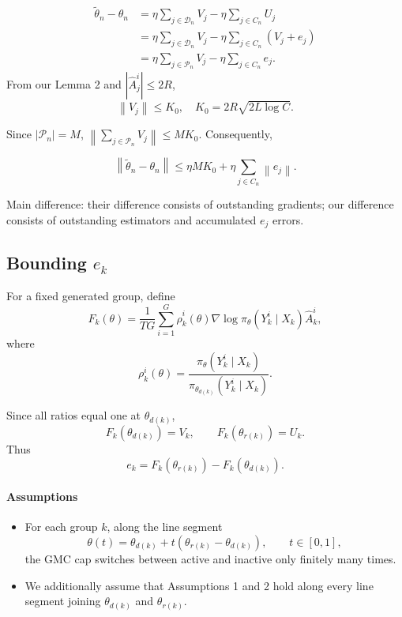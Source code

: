 \begin{lemma}
    \begin{align*}
    \tilde{\theta}_n-\theta_n & =\eta \sum_{j \in \mathcal{D}_n} V_j-\eta \sum_{j \in C_n} U_j \\
    & =\eta \sum_{j \in \mathcal{D}_n} V_j-\eta \sum_{j \in C_n}\left(V_j+e_j\right) \\
    & =\eta \sum_{j \in \mathcal{P}_n} V_j-\eta \sum_{j \in C_n} e_j .
    \end{align*}
    From our Lemma 2 and $\left|\widehat{A}_j^i\right| \leq 2 R$,
    \begin{equation} \label{eq:gentimeestbound}
            \left\|V_j\right\| \leq K_0, \quad K_0=2 R \sqrt{2 L \log C} .
    \end{equation}


    Since $\left|\mathcal{P}_n\right|=M$,
    $
    \left\|\sum_{j \in \mathcal{P}_n} V_j\right\| \leq M K_0 .
    $
    Consequently,

    $$
    \left\|\tilde{\theta}_n-\theta_n\right\| \leq \eta M K_0+\eta \sum_{j \in C_n}\left\|e_j\right\| .
    $$
\end{lemma}

Main difference: their difference consists of outstanding gradients; our difference consists of outstanding estimators and accumulated $e_j$ errors.


\subsection{Bounding $e_k$}


For a fixed generated group, define
\begin{equation*}
F_k(\theta)
=
\frac{1}{TG}\sum_{i=1}^G
\widehat\rho_k^i(\theta)
\nabla\log\pi_\theta(Y_k^i\mid X_k)
\widehat A_k^i,
\end{equation*}
where $$\rho_k^i(\theta)=\frac{\pi_\theta\left(Y_k^i \mid X_k\right)}{\pi_{\theta_{d(k)}}\left(Y_k^i \mid X_k\right)}.$$

Since all ratios equal one at $\theta_{d(k)}$,
\begin{equation*}
F_k(\theta_{d(k)})=V_k,
\qquad
F_k(\theta_{r(k)})=U_k.
\end{equation*}
Thus
\begin{equation*}
e_k=F_k(\theta_{r(k)})-F_k(\theta_{d(k)}).
\end{equation*}

\paragraph{Assumptions}
\begin{itemize}
    \item For each group $k$, along the line segment
\begin{equation*}
\theta(t)=\theta_{d(k)}
+t(\theta_{r(k)}-\theta_{d(k)}),
\qquad t\in[0,1],
\end{equation*}
the GMC cap switches between active and inactive only
finitely many times.
\item 
We additionally assume that Assumptions 1 and 2
hold along every line segment joining
$\theta_{d(k)}$ and $\theta_{r(k)}$.
\end{itemize}

